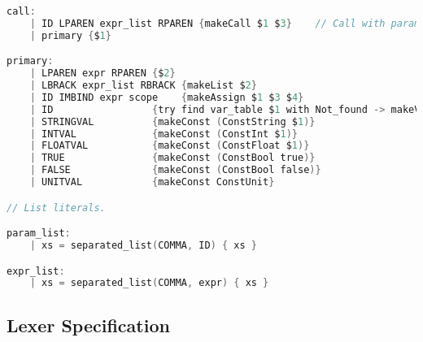 \documentclass{l4proj}
\begin{document}
\begin{appendices}
\begin{lstlisting}[language=C, label=lst:parser-spec, caption=PyFunc's full parser specification for Menhir.]
call:
    | ID LPAREN expr_list RPAREN {makeCall $1 $3}    // Call with params.
    | primary {$1}

primary:
    | LPAREN expr RPAREN {$2}
    | LBRACK expr_list RBRACK {makeList $2}
    | ID IMBIND expr scope    {makeAssign $1 $3 $4}
    | ID                 {try find var_table $1 with Not_found -> makeVar ($1)}
    | STRINGVAL          {makeConst (ConstString $1)}
    | INTVAL             {makeConst (ConstInt $1)}
    | FLOATVAL           {makeConst (ConstFloat $1)}
    | TRUE               {makeConst (ConstBool true)}
    | FALSE              {makeConst (ConstBool false)}
    | UNITVAL            {makeConst ConstUnit}

// List literals.

param_list:
    | xs = separated_list(COMMA, ID) { xs }

expr_list:
    | xs = separated_list(COMMA, expr) { xs }
\end{lstlisting}

\subsection{Lexer Specification}


\end{appendices}
\end{document}
